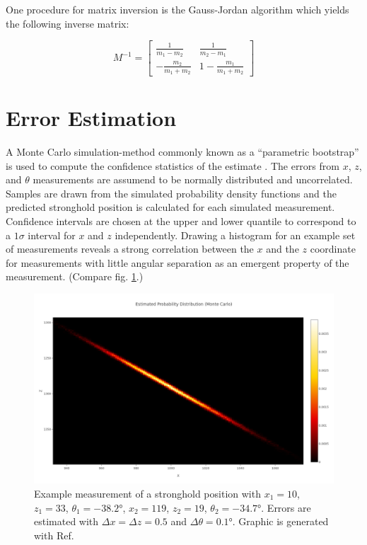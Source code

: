 \documentclass[a4paper,10pt]{article}
\begin{document}
\begin{multicols}{2}
    One procedure for matrix inversion is the Gauss-Jordan algorithm \cite[436]{alma991016822109706467} which yields the following inverse matrix:

    \begin{equation}
        M^{-1} = \begin{bmatrix}
            \frac{1}{m_1 - m_2} & \frac{1}{m_2 - m_1}\\
            -\frac{m_2}{m_1+m_2} & 1-\frac{m_1}{m_1+m_2}
        \end{bmatrix}
    \end{equation}

    \section{Error Estimation}

    A Monte Carlo simulation-method commonly known as a \enquote{parametric bootstrap} is used to compute the confidence statistics of the estimate \cite[53-56]{efron_1994_introductiontothebootstap}.
    The errors from $x$, $z$, and $\theta$ measurements are assumend to be normally distributed and uncorrelated. Samples are drawn from the simulated probability density functions and the predicted stronghold position is calculated for each simulated measurement.
    Confidence intervals are chosen at the upper and lower quantile to correspond to a $1\sigma$ interval for $x$ and $z$ independently.
    Drawing a histogram for an example set of measurements reveals a strong correlation between the $x$ and the $z$ coordinate for measurements with little angular separation as an emergent property of the measurement. (Compare fig. \ref{fig:histo}.) 

    \begin{figure}[H]
        \centering
        \includegraphics[width = \linewidth]{img/distribution_large.png}
        \caption{Example measurement of a stronghold position with $x_1 = 10$, $z_1 = 33$, $\theta_1 = -38.2\unit{\degree}$, $x_2 = 119$, $z_2 = 19$, $\theta_2 = -34.7\unit\degree$. Errors are estimated with $\Delta x = \Delta z = 0.5$ and $\Delta \theta = 0.1\unit\degree$. Graphic is generated with Ref. \cite{repo_triang}}
        \label{fig:histo}
    \end{figure}


\end{multicols}
\end{document}
